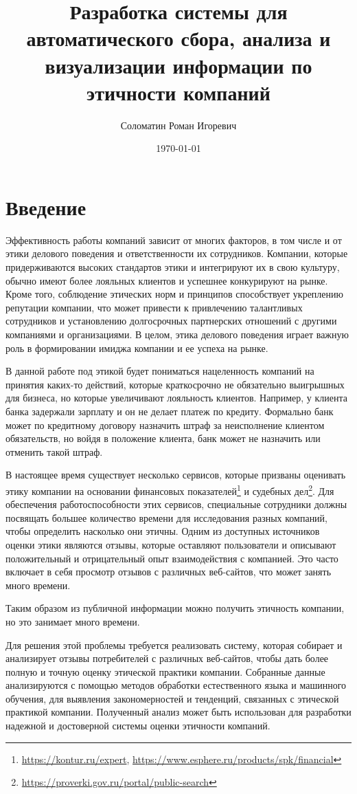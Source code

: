 \documentclass[PI, VKR]{HSEUniversity}
\author{Соломатин Роман Игоревич}
\date{\today}
\title{Разработка системы для автоматического сбора, анализа и визуализации информации по этичности компаний}
\begin{document}
\maketitle


\chapter*{Введение}
\label{sec:orgbbd0251}
Эффективность работы компаний зависит от многих факторов, в том числе и от этики делового поведения и ответственности их сотрудников. Компании, которые придерживаются высоких стандартов этики и интегрируют их в свою культуру, обычно имеют более лояльных клиентов и успешнее конкурируют на рынке\autocite{mure_esg_2021}. Кроме того, соблюдение этических норм и принципов способствует укреплению репутации компании, что может привести к привлечению талантливых сотрудников и установлению долгосрочных партнерских отношений с другими компаниями и организациями. В целом, этика делового поведения играет важную роль в формировании имиджа компании и ее успеха на рынке.

В данной работе под этикой будет пониматься нацеленность компаний на принятия каких-то действий, которые краткосрочно не обязательно выигрышных для бизнеса, но которые увеличивают лояльность клиентов. Например, у клиента банка задержали зарплату и он не делает платеж по кредиту. Формально банк может по кредитному договору назначить штраф за неисполнение клиентом обязательств, но войдя в положение клиента, банк может не назначить или отменить такой штраф.

В настоящее время существует несколько сервисов, которые призваны оценивать этику компании на основании финансовых показателей\footnote{\url{https://kontur.ru/expert}, \url{https://www.esphere.ru/products/spk/financial}} и судебных дел\footnote{\url{https://proverki.gov.ru/portal/public-search}}. Для обеспечения работоспособности этих сервисов, специальные сотрудники должны посвящать большее количество времени для исследования разных компаний, чтобы определить насколько они этичны. Одним из доступных источников оценки этики являются отзывы, которые оставляют пользователи и описывают положительный и отрицательный опыт взаимодействия с компанией. Это часто включает в себя просмотр отзывов с различных веб-сайтов, что может занять много времени.

Таким образом из публичной информации можно получить этичность компании, но это занимает много времени.

Для решения этой проблемы требуется реализовать систему, которая собирает и анализирует отзывы потребителей с различных веб-сайтов, чтобы дать более полную и точную оценку этической практики компании. Собранные данные анализируются с помощью методов обработки естественного языка и машинного обучения, для выявления закономерностей и тенденций, связанных с этической практикой компании. Полученный анализ может быть использован для разработки надежной и достоверной системы оценки этичности компаний.
\end{document}
